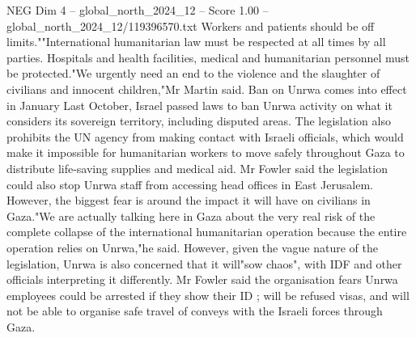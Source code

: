 \begin{textsample}{NEG Dim 4 – global\_north\_2024\_12 – Score 1.00 – global\_north\_2024\_12/119396570.txt}
Workers and patients should be off limits.""International humanitarian law must be respected at all times by all parties.
Hospitals and health facilities, medical and humanitarian personnel must be protected."We urgently need an end to the violence and the slaughter of civilians and innocent children,"Mr Martin said.
Ban on Unrwa comes into effect in January Last October, Israel passed laws to ban Unrwa activity on what it considers its sovereign territory, including disputed areas.
The legislation also prohibits the UN agency from making contact with Israeli officials, which would make it impossible for humanitarian workers to move safely throughout Gaza to distribute life-saving supplies and medical aid.
Mr Fowler said the legislation could also stop Unrwa staff from accessing head offices in East Jerusalem.
However, the biggest fear is around the impact it will have on civilians in Gaza."We are actually talking here in Gaza about the very real risk of the complete collapse of the international humanitarian operation because the entire operation relies on Unrwa,"he said.
However, given the vague nature of the legislation, Unrwa is also concerned that it will"sow chaos", with IDF and other officials interpreting it differently.
Mr Fowler said the organisation fears Unrwa employees could be arrested if they show their ID ; will be refused visas, and will not be able to organise safe travel of conveys with the Israeli forces through Gaza.

\end{textsample}
